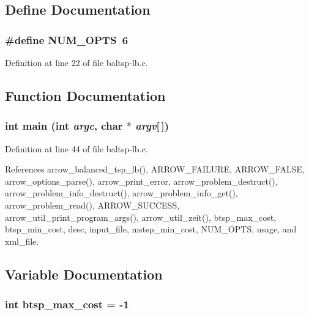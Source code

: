 \subsection{Define Documentation}
\hypertarget{bin_2baltsp-lb_8c_9b58b2c4af931c8486a986c9deca40f5}{
\subsubsection[{NUM\_\-OPTS}]{\setlength{\rightskip}{0pt plus 5cm}\#define NUM\_\-OPTS~6}}
\label{bin_2baltsp-lb_8c_9b58b2c4af931c8486a986c9deca40f5}




Definition at line 22 of file baltsp-lb.c.

\subsection{Function Documentation}
\hypertarget{bin_2baltsp-lb_8c_0ddf1224851353fc92bfbff6f499fa97}{
\subsubsection[{main}]{\setlength{\rightskip}{0pt plus 5cm}int main (int {\em argc}, \/  char $\ast$ {\em argv}\mbox{[}$\,$\mbox{]})}}
\label{bin_2baltsp-lb_8c_0ddf1224851353fc92bfbff6f499fa97}




Definition at line 44 of file baltsp-lb.c.

References arrow\_\-balanced\_\-tsp\_\-lb(), ARROW\_\-FAILURE, ARROW\_\-FALSE, arrow\_\-options\_\-parse(), arrow\_\-print\_\-error, arrow\_\-problem\_\-destruct(), arrow\_\-problem\_\-info\_\-destruct(), arrow\_\-problem\_\-info\_\-get(), arrow\_\-problem\_\-read(), ARROW\_\-SUCCESS, arrow\_\-util\_\-print\_\-program\_\-args(), arrow\_\-util\_\-zeit(), btsp\_\-max\_\-cost, btsp\_\-min\_\-cost, desc, input\_\-file, mstsp\_\-min\_\-cost, NUM\_\-OPTS, usage, and xml\_\-file.

\subsection{Variable Documentation}
\hypertarget{bin_2baltsp-lb_8c_8135b6557d64f65441d8f07fdc21ffdc}{
\subsubsection[{btsp\_\-max\_\-cost}]{\setlength{\rightskip}{0pt plus 5cm}int {\bf btsp\_\-max\_\-cost} = -1}}
\label{bin_2baltsp-lb_8c_8135b6557d64f65441d8f07fdc21ffdc}




